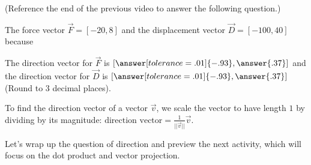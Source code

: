 \documentclass{ximera}
\begin{document}
\begin{problem}
    (Reference the end of the previous video to answer the following question.)

    The force vector $\vec{F}=[-20,8]$ and the displacement vector $\vec{D}=[-100,40]$  because 

The direction vector for $\vec{F}$ is $[\answer[tolerance=.01]{-.93},\answer{.37}]$ and the direction vector for $\vec{D}$ is $[\answer[tolerance=.01]{-.93},\answer{.37}]$ (Round to 3 decimal places).

    \begin{feedback}
        To find the direction vector of a vector $\vec{v}$, we scale the vector to have length $1$ by dividing by its magnitude: $\text{direction vector}=\frac{1}{||\vec{v}||}\vec{v}$.
    \end{feedback}
\end{problem}

Let's wrap up the question of direction and preview the next activity, which will focus on the dot product and vector projection.

\end{document}
